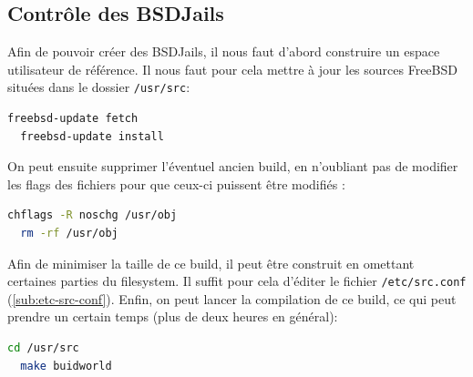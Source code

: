 \documentclass[10pt,a4paper]{article}
\begin{document}
\subsection{Contrôle des BSDJails}
\label{subs:Contrôle des BSDJails}
Afin de pouvoir créer des BSDJails, il nous faut d'abord construire un espace utilisateur de référence.
Il nous faut pour cela mettre à jour les sources FreeBSD situées dans le dossier \texttt{/usr/src}:
\begin{lstlisting}[language=bash]
  freebsd-update fetch
  freebsd-update install
\end{lstlisting}
On peut ensuite supprimer l'éventuel ancien build, en n'oubliant pas de modifier les flags des fichiers pour que ceux-ci puissent être modifiés :
\begin{lstlisting}[language=bash]
  chflags -R noschg /usr/obj
  rm -rf /usr/obj
\end{lstlisting}
Afin de minimiser la taille de ce build, il peut être construit en omettant certaines parties du filesystem. Il suffit pour cela d'éditer le fichier \texttt{/etc/src.conf} (\ref{sub:etc-src-conf}).
Enfin, on peut lancer la compilation de ce build, ce qui peut prendre un certain temps (plus de deux heures en général):
\begin{lstlisting}[language=bash]
  cd /usr/src
  make buidworld
\end{lstlisting}
\end{document}
